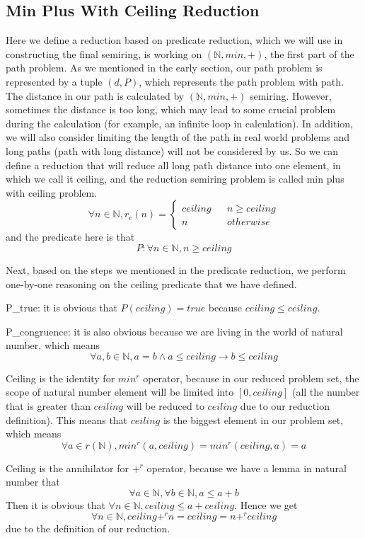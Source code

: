 \documentclass[a4paper,10pt]{article}
\newcommand{\e}[2]{
\begin{equation}
  \label{#1} 
  #2
\end{equation}
}
\begin{document}
\subsection{Min Plus With Ceiling Reduction}
Here we define a reduction based on predicate reduction, which we will use in constructing the final semiring, is working on $(\mathbb{N},min,+)$, the first part of the path problem. 
As we mentioned in the early section, our path problem is represented by a tuple $(d,P)$, which represents the path problem with path. 
The distance in our path is calculated by $(\mathbb{N},min,+)$ semiring. 
However, sometimes the distance is too long, which may lead to some crucial problem during the calculation (for example, an infinite loop in calculation). In addition, we will also consider limiting the length of the path in real world problems and long paths (path with long distance) will not be considered by us. 
So we can define a reduction that will reduce all long path distance into one element, in which we call it ceiling, and the reduction semiring problem is called min plus with ceiling problem. \e{pr:def:min_plus_ceiling}{\forall n \in \mathbb{N}, r_c(n) = \left\{
\begin{aligned}
ceiling &  & n \geq ceiling \\
n &  & otherwise 
\end{aligned}
\right.} and the predicate here is that \[P : \forall n \in \mathbb{N}, n \geq ceiling\]

Next, based on the steps we mentioned in the predicate reduction, we perform one-by-one reasoning on the ceiling predicate that we have defined.

P\_true: it is obvious that $P(ceiling) = true$ because $ceiling \leq ceiling$.

P\_congruence: it is also obvious because we are living in the world of natural number, which means \[\forall a,b \in \mathbb{N}, a = b \wedge a \leq ceiling \rightarrow b \leq ceiling\]

Ceiling is the identity for $min^r$ operator, because in our reduced problem set, the scope of natural number element will be limited into $[0,ceiling]$ (all the number that is greater than $ceiling$ will be reduced to $ceiling$ due to our reduction definition). This means that $ceiling$ is the biggest element in our problem set, which means \[\forall a \in r(\mathbb{N}), min^r (a,ceiling) = min^r(ceiling,a) = a\]

Ceiling is the annihilator for $+^r$ operator, because we have a lemma in natural number that \[\forall a \in \mathbb{N}, \forall b \in \mathbb{N}, a \leq a + b\] Then it is obvious that $\forall n \in \mathbb{N}, ceiling \leq a + ceiling$. Hence we get \[\forall n \in \mathbb{N}, ceiling +^r n = ceiling = n +^r ceiling\] due to the definition of our reduction.
\end{document}
